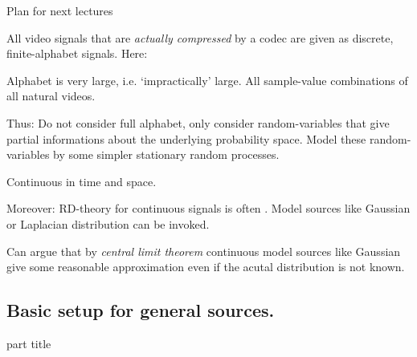 \begin{frame}{Plan for next lectures}

\bit
\item All video signals that are \textit{actually compressed} by a codec are given as discrete, finite-alphabet 
signals. Here:
\bit
\item Alphabet is very large, i.e. `impractically' large. All sample-value combinations of all natural 
videos.  
\item Thus: Do not consider full alphabet, only consider random-variables that give partial informations about 
the underlying probability space. Model these random-variables by some simpler stationary random processes. 
\eit
\item {} Continuous 
in time and space.
\item Moreover: RD-theory for continuous signals is often . Model sources like Gaussian or 
Laplacian distribution can be invoked. 
\item Can argue that by \textit{central limit theorem} continuous model sources like Gaussian give some reasonable approximation even if the acutal distribution is not known. 
\eit 
\end{frame}



\subsection{Basic setup for general sources.} 
\begin{frame}
 \vspace{12.0ex}
\begin{center}
\begin{beamercolorbox}[sep=12pt,center]{part title}
\insertsubsection\par
\end{beamercolorbox}
\end{center}
\end{frame}




